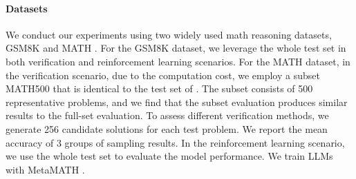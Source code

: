 \documentclass{article} %
\begin{document}
\paragraph{Datasets}
We conduct our experiments using two widely used math reasoning datasets, GSM8K \citep{cobbe2021training} and MATH \citep{MATH}. 
For the GSM8K dataset, we leverage the whole test set in both verification and reinforcement learning scenarios. 
For the MATH dataset, in the verification scenario,
due to the computation cost,  we employ a subset MATH500 that is identical to the test set of \citet{lightman2023let}. The subset consists of 500 representative problems, and we find that the subset evaluation produces similar results to the full-set evaluation.
To assess different verification methods, we generate 256 candidate solutions for each test problem.
We report the mean accuracy of $3$ groups of sampling results.
In the reinforcement learning scenario, we use the whole test set to evaluate the model performance.
We train LLMs with MetaMATH \citep{yu2023metamath}.
\end{document}
